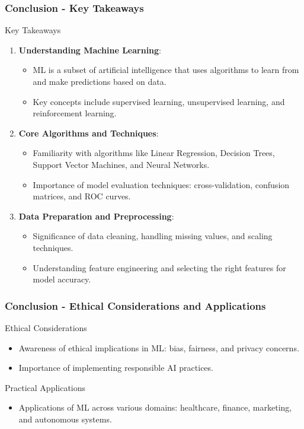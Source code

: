 \documentclass[aspectratio=169]{beamer}
\begin{document}
\begin{frame}[fragile]
    \frametitle{Conclusion - Key Takeaways}
    \begin{block}{Key Takeaways}
        \begin{enumerate}
            \item \textbf{Understanding Machine Learning}:
            \begin{itemize}
                \item ML is a subset of artificial intelligence that uses algorithms to learn from and make predictions based on data.
                \item Key concepts include supervised learning, unsupervised learning, and reinforcement learning.
            \end{itemize}

            \item \textbf{Core Algorithms and Techniques}:
            \begin{itemize}
                \item Familiarity with algorithms like Linear Regression, Decision Trees, Support Vector Machines, and Neural Networks.
                \item Importance of model evaluation techniques: cross-validation, confusion matrices, and ROC curves.
            \end{itemize}

            \item \textbf{Data Preparation and Preprocessing}:
            \begin{itemize}
                \item Significance of data cleaning, handling missing values, and scaling techniques.
                \item Understanding feature engineering and selecting the right features for model accuracy.
            \end{itemize}
        \end{enumerate}
    \end{block}
\end{frame}

\begin{frame}[fragile]
    \frametitle{Conclusion - Ethical Considerations and Applications}
    \begin{block}{Ethical Considerations}
        \begin{itemize}
            \item Awareness of ethical implications in ML: bias, fairness, and privacy concerns.
            \item Importance of implementing responsible AI practices.
        \end{itemize}
    \end{block}

    \begin{block}{Practical Applications}
        \begin{itemize}
            \item Applications of ML across various domains: healthcare, finance, marketing, and autonomous systems.
        \end{itemize}
    \end{block}
\end{frame}
\end{document}
